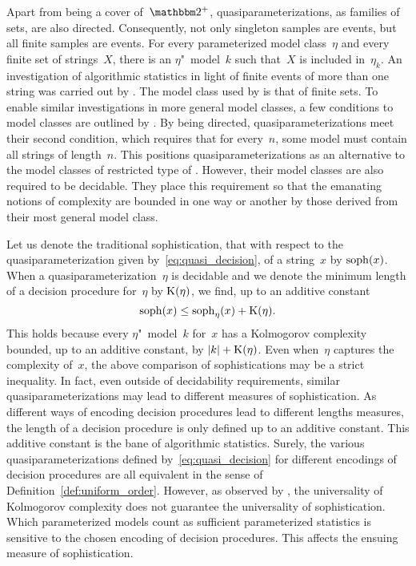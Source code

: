 Apart from being a cover of~$\binary^+$, quasiparameterizations, as families of sets, are also directed.
Consequently, not only singleton samples are events, but all finite samples are events.
For every parameterized model class~$\eta$ and every finite set of strings~$X$, there is an $\eta$"~model~$k$ such that~$X$ is included in~$\eta_k$.
An investigation of algorithmic statistics in light of finite events of more than one string was carried out by \textcite{milovanov2016algorithmic}.
The model class used by \citeauthor{milovanov2016algorithmic} is that of finite sets.
To enable similar investigations in more general model classes, a few conditions to model classes are outlined by \textcite[][Section~6.1]{vereshchagin2017algorithmic}.
By being directed, quasiparameterizations meet their second condition, which requires that for every~$n$, some model must contain all strings of length~$n$.
This positions quasiparameterizations as an alternative to the model classes of restricted type of \textcite{vereshchagin2017algorithmic}.
However, their model classes are also required to be decidable.
They place this requirement so that the emanating notions of complexity are bounded in one way or another by those derived from their most general model class.

%
Let us denote the traditional sophistication, that with respect to the quasiparameterization given by~\eqref{eq:quasi_decision}, of a string~$x$ by $\operatorname{soph}(x)$.
When a quasiparameterization~$\eta$ is decidable and we denote the minimum length of a decision procedure for~$\eta$ by $\operatorname{K}(\eta)$, we find, up to an additive constant
\begin{equation}
\label{eq:soph}
  \operatorname{soph}(x) \le \operatorname{soph}_\eta(x) + \operatorname{K}(\eta).
\end{equation}
This holds because every $\eta$"~model~$k$ for~$x$ has a Kolmogorov complexity bounded, up to an additive constant, by ${\lvert k\rvert} + \operatorname{K}(\eta)$.
Even when~$\eta$ captures the complexity of~$x$, the above comparison of sophistications may be a strict inequality.
In fact, even outside of decidability requirements, similar quasiparameterizations may lead to different measures of sophistication.
As different ways of encoding decision procedures lead to different lengths measures, the length of a decision procedure is only defined up to an additive constant.
This additive constant is the bane of algorithmic statistics.
Surely, the various quasiparameterizations defined by~\eqref{eq:quasi_decision} for different encodings of decision procedures are all equivalent in the sense of Definition~\ref{def:uniform_order}.
However, as observed by \textcite{bloem2015two}, the universality of Kolmogorov complexity does not guarantee the universality of sophistication.
Which parameterized models count as sufficient parameterized statistics is sensitive to the chosen encoding of decision procedures.
This affects the ensuing measure of sophistication.

